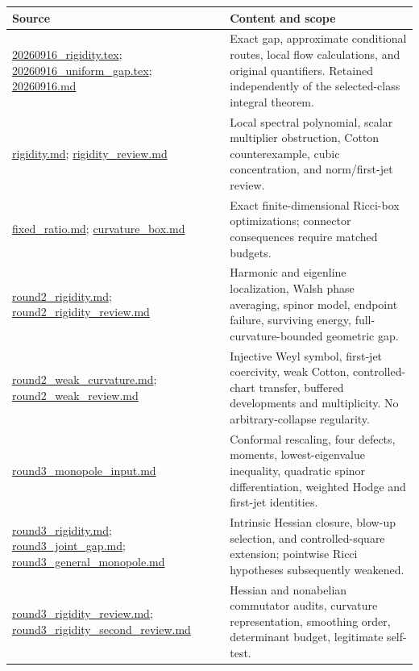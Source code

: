 \documentclass[11pt,a4paper]{article}
\theoremstyle{definition}
\theoremstyle{remark}
\newcommand{\roundref}[2]{\href{run:../references/rounds/#1}{#2}}
\newcommand{\baseref}[2]{\href{run:#1}{#2}}
\numberwithin{equation}{section}
\begin{document}
\small
\begin{longtable}{L{.35\textwidth}L{.59\textwidth}}
\toprule Source & Content and scope\\\midrule\endhead
\baseref{20260916_rigidity.tex}{20260916\_rigidity.tex};
\baseref{20260916_uniform_gap.tex}{20260916\_uniform\_gap.tex};
\baseref{20260916.md}{20260916.md} & Exact gap, approximate conditional
routes, local flow calculations, and original quantifiers. Retained
independently of the selected-class integral theorem.\\
\roundref{rigidity.md}{rigidity.md};
\roundref{rigidity_review.md}{rigidity\_review.md} & Local spectral
polynomial, scalar multiplier obstruction, Cotton counterexample, cubic
concentration, and norm/first-jet review.\\
\roundref{fixed_ratio.md}{fixed\_ratio.md};
\roundref{curvature_box.md}{curvature\_box.md} & Exact finite-dimensional
Ricci-box optimizations; connector consequences require matched budgets.\\
\roundref{round2_rigidity.md}{round2\_rigidity.md};
\roundref{round2_rigidity_review.md}{round2\_rigidity\_review.md} & Harmonic
and eigenline localization, Walsh phase averaging, spinor model, endpoint
failure, surviving energy, full-curvature-bounded geometric gap.\\
\roundref{round2_weak_curvature.md}{round2\_weak\_curvature.md};
\roundref{round2_weak_review.md}{round2\_weak\_review.md} & Injective Weyl
symbol, first-jet coercivity, weak Cotton, controlled-chart transfer,
buffered developments and multiplicity. No arbitrary-collapse regularity.\\
\roundref{round3_monopole_input.md}{round3\_monopole\_input.md} & Conformal
rescaling, four defects, moments, lowest-eigenvalue inequality, quadratic
spinor differentiation, weighted Hodge and first-jet identities.\\
\roundref{round3_rigidity.md}{round3\_rigidity.md};
\roundref{round3_joint_gap.md}{round3\_joint\_gap.md};
\roundref{round3_general_monopole.md}{round3\_general\_monopole.md} &
Intrinsic Hessian closure, blow-up selection, and controlled-square
extension; pointwise Ricci hypotheses subsequently weakened.\\
\roundref{round3_rigidity_review.md}{round3\_rigidity\_review.md};
\roundref{round3_rigidity_second_review.md}{round3\_rigidity\_second\_review.md}
& Hessian and nonabelian commutator audits, curvature representation,
smoothing order, determinant budget, legitimate self-test.\\

\end{longtable}
\end{document}
